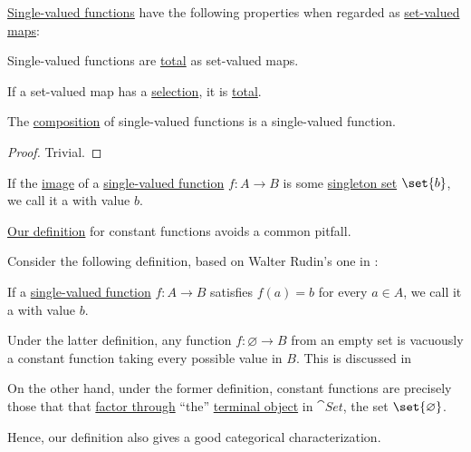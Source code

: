 \begin{proposition}\label{thm:def:function}
  \hyperref[def:function]{Single-valued functions} have the following properties when regarded as \hyperref[def:function]{set-valued maps}:
  \begin{thmenum}
     Single-valued functions are \hyperref[def:set_valued_map/partial]{total} as set-valued maps.

     If a set-valued map has a \hyperref[def:function/selection]{selection}, it is \hyperref[def:set_valued_map/partial]{total}.

     The \hyperref[def:set_valued_map/composition]{composition} of single-valued functions is a single-valued function.
  \end{thmenum}
\end{proposition}
\begin{proof}
  Trivial.
\end{proof}

\begin{definition}\label{def:indicator_function}
\end{definition}

\begin{definition}\label{def:constant_function}\mimprovised
  If the \hyperref[def:set_valued_map/image]{image} of a \hyperref[def:function]{single-valued function} \( f: A \to B \) is some \hyperref[def:singleton_set]{singleton set} \( \set{ b } \), we call it a  with value \( b \).
\end{definition}

\begin{remark}\label{rem:constant_function}
  \hyperref[def:constant_function]{Our definition} for constant functions avoids a common pitfall.

  Consider the following definition, based on Walter Rudin's one in \cite[def. 4.3]{Rudin1976AnalysisPrinciples}:
  \begin{displayquote}
    If a \hyperref[def:function]{single-valued function} \( f: A \to B \) satisfies \( f(a) = b \) for every \( a \in A \), we call it a  with value \( b \).
  \end{displayquote}

  Under the latter definition, any function \( f: \varnothing \to B \) from an empty set is vacuously a constant function taking every possible value in \( B \). This is discussed in

  On the other hand, under the former definition, constant functions are precisely those that that \hyperref[def:factors_through]{factor through} \enquote{the} \hyperref[def:universal_objects/terminal]{terminal object} in \hyperref[def:category_of_small_sets]{\( \cat{Set} \)}, the set \( \set{ \varnothing } \).

  Hence, our definition also gives a good categorical characterization.
\end{remark}

